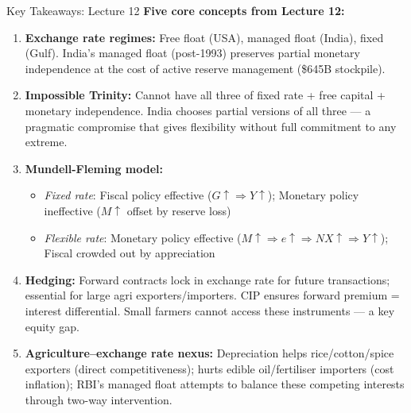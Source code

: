 \documentclass[
  ignorenonframetext,
  aspectratio=169,
]{beamer}
\makeatletter
\providecommand{\tightlist}{%
  \setlength{\itemsep}{0pt}\setlength{\parskip}{0pt}}
\let\quarto@originallabel\label
\DeclareRobustCommand*{\label}[1]{\quarto@originallabel{#1}}
\makeatother
\begin{document}
\begin{frame}{Key Takeaways: Lecture 12}
\label{key-takeaways-lecture-12}
\textbf{Five core concepts from Lecture 12:}

\begin{enumerate}
\item
  \textbf{Exchange rate regimes:} Free float (USA), managed float
  (India), fixed (Gulf). India's managed float (post-1993) preserves
  partial monetary independence at the cost of active reserve management
  (\$645B stockpile).
\item
  \textbf{Impossible Trinity:} Cannot have all three of fixed rate +
  free capital + monetary independence. India chooses partial versions
  of all three --- a pragmatic compromise that gives flexibility without
  full commitment to any extreme.
\item
  \textbf{Mundell-Fleming model:}

  \begin{itemize}
  \tightlist
  \item
    \emph{Fixed rate}: Fiscal policy effective
    (\(G\uparrow \Rightarrow Y\uparrow\)); Monetary policy ineffective
    (\(M\uparrow\) offset by reserve loss)
  \item
    \emph{Flexible rate}: Monetary policy effective
    (\(M\uparrow \Rightarrow e\uparrow \Rightarrow NX\uparrow \Rightarrow Y\uparrow\));
    Fiscal crowded out by appreciation
  \end{itemize}
\item
  \textbf{Hedging:} Forward contracts lock in exchange rate for future
  transactions; essential for large agri exporters/importers. CIP
  ensures forward premium = interest differential. Small farmers cannot
  access these instruments --- a key equity gap.
\item
  \textbf{Agriculture--exchange rate nexus:} Depreciation helps
  rice/cotton/spice exporters (direct competitiveness); hurts edible
  oil/fertiliser importers (cost inflation); RBI's managed float
  attempts to balance these competing interests through two-way
  intervention.
\end{enumerate}
\end{frame}
\end{document}
